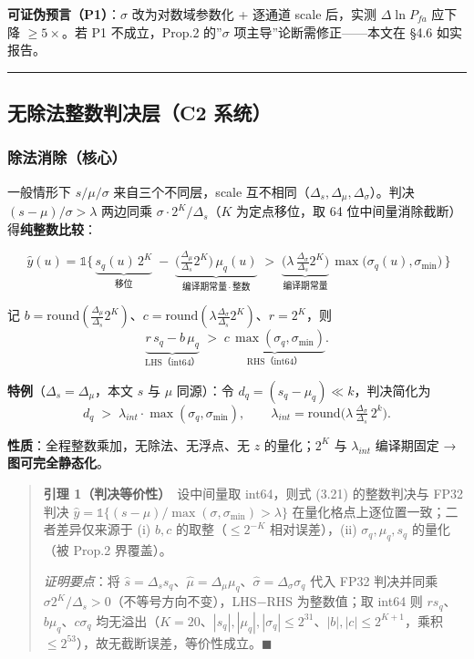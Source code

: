\textbf{可证伪预言（P1）}：\(\sigma\) 改为对数域参数化 + 逐通道 scale
后，实测 \(\Delta\ln P_{fa}\) 应下降 \(\ge 5\times\)。若 P1
不成立，Prop.2 的''\(\sigma\) 项主导''论断需修正------本文在 §4.6
如实报告。

\begin{center}\rule{0.5\linewidth}{0.5pt}\end{center}

\subsection{无除法整数判决层（C2
系统）}\label{ux65e0ux9664ux6cd5ux6574ux6570ux5224ux51b3ux5c42c2-ux7cfbux7edf}

\subsubsection{除法消除（核心）}\label{ux9664ux6cd5ux6d88ux9664ux6838ux5fc3}

一般情形下 \(s/\mu/\sigma\) 来自三个不同层，scale
互不相同（\(\Delta_s,\Delta_\mu,\Delta_\sigma\)）。判决
\((s-\mu)/\sigma>\lambda\) 两边同乘
\(\sigma\cdot 2^{K}/\Delta_s\)（\(K\) 为定点移位，取 64
位中间量消除截断）得\textbf{纯整数比较}：

\[
\boxed{\;
\hat{y}(u)=\mathbb{1}\Big\{\,
\underbrace{s_q(u)\,2^{K}}_{\text{移位}}\;-\;
\underbrace{\Big(\tfrac{\Delta_\mu}{\Delta_s}2^{K}\Big)\,\mu_q(u)}_{\text{编译期常量}\,\cdot\,\text{整数}}
\;>\;
\underbrace{\Big(\lambda\,\tfrac{\Delta_\sigma}{\Delta_s}2^{K}\Big)}_{\text{编译期常量}}\,
\max\!\big(\sigma_q(u),\sigma_{\min}\big)\,\Big\}}
\tag{3.20}
\]

记
\(b=\mathrm{round}(\frac{\Delta_\mu}{\Delta_s}2^{K})\)、\(c=\mathrm{round}(\lambda\frac{\Delta_\sigma}{\Delta_s}2^{K})\)、\(r=2^{K}\)，则
\[
\underbrace{r\,s_q - b\,\mu_q}_{\text{LHS（int64）}} \;>\;
\underbrace{c\,\max(\sigma_q,\sigma_{\min})}_{\text{RHS（int64）}}.
\tag{3.21}
\]

\textbf{特例}（\(\Delta_s=\Delta_\mu\)，本文 \(s\) 与 \(\mu\) 同源）：令
\(d_q=(s_q-\mu_q)\ll k\)，判决简化为 \[
d_q \;>\; \lambda_{int}\cdot\max(\sigma_q,\sigma_{\min}),
\qquad
\lambda_{int}=\mathrm{round}\!\Big(\lambda\,\tfrac{\Delta_\sigma}{\Delta_s}\,2^{k}\Big).
\tag{3.22}
\]

\textbf{性质}：全程整数乘加，无除法、无浮点、无 \(z\) 的量化；\(2^{K}\)
与 \(\lambda_{int}\) 编译期固定 → \textbf{图可完全静态化}。

\begin{quote}
\textbf{引理 1（判决等价性）}　设中间量取 int64，则式 (3.21)
的整数判决与 FP32 判决
\(\hat y=\mathbb{1}\{(s-\mu)/\max(\sigma,\sigma_{\min})>\lambda\}\)
在量化格点上逐位置一致；二者差异仅来源于 (i) \(b,c\)
的取整（\(\le 2^{-K}\) 相对误差），(ii) \(\sigma_q,\mu_q,s_q\)
的量化（被 Prop.2 界覆盖）。

\emph{证明要点}：将
\(\hat s=\Delta_s s_q\)、\(\hat\mu=\Delta_\mu\mu_q\)、\(\hat\sigma=\Delta_\sigma\sigma_q\)
代入 FP32 判决并同乘
\(\sigma 2^K/\Delta_s>0\)（不等号方向不变），LHS−RHS 为整数值；取 int64
则 \(r s_q\)、\(b\mu_q\)、\(c\sigma_q\)
均无溢出（\(K=20\)、\(|s_q|,|\mu_q|,|\sigma_q|\le 2^{31}\)、\(|b|,|c|\le 2^{K+1}\)，乘积
\(\le 2^{53}\)），故无截断误差，等价性成立。\(\blacksquare\)
\end{quote}

